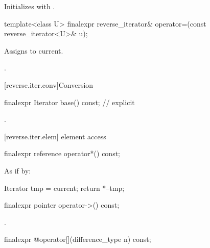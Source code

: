 \begin{itemdescr}
\pnum
\effects
Initializes
with
.
\end{itemdescr}

%
\begin{itemdecl}
template<class U>
finalexpr reverse_iterator&
  operator=(const reverse_iterator<U>& u);
\end{itemdecl}

\begin{itemdescr}
\pnum
\effects
Assigns  to current.

\pnum
\returns
{}.
\end{itemdescr}

[reverse.iter.conv]{Conversion}

%
\begin{itemdecl}
finalexpr Iterator base() const;          // explicit
\end{itemdecl}

\begin{itemdescr}
\pnum
\returns
{}.
\end{itemdescr}

[reverse.iter.elem]{ element access}

%
\begin{itemdecl}
finalexpr reference operator*() const;
\end{itemdecl}

\begin{itemdescr}
\pnum
\effects
As if by:
\begin{codeblock}
Iterator tmp = current;
return *--tmp;
\end{codeblock}

\end{itemdescr}

%
\begin{itemdecl}
finalexpr pointer operator->() const;
\end{itemdecl}

\begin{itemdescr}
\pnum
\returns {}.
\end{itemdescr}

%
\begin{itemdecl}
finalexpr @\unspec@ operator[](difference_type n) const;
\end{itemdecl}

